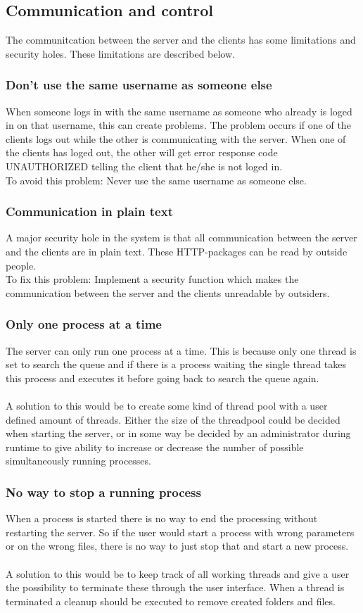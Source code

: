 \subsection{Communication and control}
The communitcation between the server and the clients has some limitations and security holes. These limitations are described below.

\subsubsection{Don't use the same username as someone else}
When someone logs in with the same username as someone who already is loged in on that username, this can create problems. The problem occurs if one of the clients logs out while the other is communicating with the server. When one of the clients has loged out, the other will get error response code UNAUTHORIZED telling the client that he/she is not loged in.
\\To avoid this problem: Never use the same username as someone else.
\subsubsection{Communication in plain text}
A major security hole in the system is that all communication between the server and the clients are in plain text. These HTTP-packages can be read by outside people.
\\To fix this problem: Implement a security function which makes the communication between the server and the clients unreadable by outsiders.
\subsubsection{Only one process at a time}
The server can only run one process at a time. This is because only one thread is set to search the queue and if there is a process waiting the single thread takes this process and executes it before going back to search the queue again.\\
\\
A solution to this would be to create some kind of thread pool with a user defined amount of threads. Either the size of the threadpool could be decided when starting the server, or in some way be decided by an administrator during runtime to give ability to increase or decrease the number of possible simultaneously running processes.
\subsubsection{No way to stop a running process}
When a process is started there is no way to end the processing without restarting the server. So if the user would start a process with wrong parameters or on the wrong files, there is no way to just stop that and start a new process.\\
\\
A solution to this would be to keep track of all working threads and give a user the possibility to terminate these through the user interface. When a thread is terminated a cleanup should be executed to remove created folders and files.
